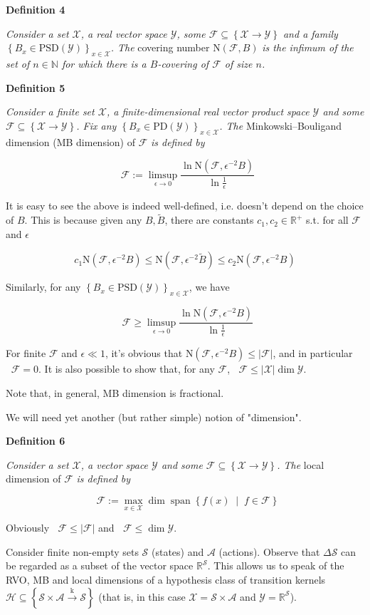 \documentclass[a4paper]{article}
\newcommand{\Co}[1]{}
\DeclareMathOperator{\Sp}{span}
\newcommand{\AP}[1]{\left(#1\right)}
\newcommand{\AC}[1]{\left\{#1\right\}}
\newcommand{\ACM}[2]{\left\{#1\;\middle\vert\;#2\right\}}
\newcommand{\Nats}{\mathbb{N}}
\newcommand{\Reals}{\mathbb{R}}
\newcommand{\PD}{\mathrm{PD}}
\newcommand{\PSD}{\mathrm{PSD}}
\newcommand{\Abs}[1]{\left\vert #1 \right\vert}
\newcommand{\K}{\xrightarrow{\mathrm{k}}}
\newcommand{\B}{B}
\newcommand{\X}{\mathcal{X}}
\newcommand{\Y}{\mathcal{Y}}
\newcommand{\F}{\mathcal{F}}
\newcommand{\St}{\mathcal{S}}
\newcommand{\A}{\mathcal{A}}
\newcommand{\Hy}{\mathcal{H}}
\DeclareMathOperator{\MB}{\dim_{MB}}
\DeclareMathOperator{\LD}{\dim_{loc}}
\newcommand{\N}{\mathrm{N}}
\begin{document}
\textbf{Definition 4}\Co{b}

\textit{Consider a set $\X$, a real vector space $\Y$, some $\F\subseteq\AC{\X\rightarrow\Y}$ and a family $\AC{\B _x\in\PSD(\Y)}_{x\in\X}$. The}\Co{i} covering number $\N(\F,\B )$ \textit{is the infimum of the set of $n\in\Nats$ for which there is a $\B $-covering of $\F$ of size $n$.}\Co{i}

\textbf{Definition 5}\Co{b}

\textit{Consider a finite set $\X$, a finite-dimensional real vector product space $\Y$ and some $\F\subseteq\AC{\X\rightarrow\Y}$. Fix any $\AC{\B_x \in\PD(\Y)}_{x\in\X}$.  The}\Co{i} Minkowski–Bouligand dimension (MB dimension) of $\F$ \textit{is defined by}\Co{i}

$$\MB{\F}:=\limsup_{\epsilon \rightarrow 0}{\frac{\ln{\N\AP{\F,\epsilon^{-2} \B }}}{\ln\frac{1}{\epsilon}}}$$

It is easy to see the above is indeed well-defined, i.e. doesn't depend on the choice of $\B $. This is because given any $\B ,\tilde{\B }$, there are constants $c_1,c_2\in\Reals^+$ s.t. for all $\F$ and $\epsilon$

$$c_1 \N\AP{\F,\epsilon^{-2} \B } \leq \N\AP{\F,\epsilon^{-2} \tilde{\B }} \leq c_2\N\AP{\F,\epsilon^{-2} \B }$$

Similarly, for any $\AC{B_x\in\PSD(\Y)}_{x\in\X}$, we have

$$\MB{\F}\geq\limsup_{\epsilon \rightarrow 0}{\frac{\ln{\N\AP{\F,\epsilon^{-2} \B }}}{\ln\frac{1}{\epsilon}}}$$

For finite $\F$ and $\epsilon\ll1$, it's obvious that $\N\AP{\F,\epsilon^{-2}\B }\leq\Abs{\F}$, and in particular $\MB\F=0$. It is also possible to show that, for any $\F$, $\MB{\F}\leq\Abs{\X}\dim{\Y}$.

Note that, in general, MB dimension is fractional.

We will need yet another (but rather simple) notion of "dimension".

\textbf{Definition 6}\Co{b}

\textit{Consider a set $\X$, a vector space $\Y$ and some $\F\subseteq\AC{\X\rightarrow\Y}$. The}\Co{i} local dimension of $\F$ \textit{is defined by}\Co{i}

$$\LD{\F}:=\max_{x\in\X}{\dim\Sp\ACM{f(x)}{f\in\F}}$$

Obviously $\LD{\F}\leq\Abs{\F}$ and $\LD{\F}\leq\dim{\Y}$.

Consider finite non-empty sets $\St$ (states) and $\A$ (actions). Observe that $\Delta\St$ can be regarded as a subset of the vector space $\Reals^\St$. This allows us to speak of the RVO, MB and local dimensions of a hypothesis class of transition kernels $\Hy\subseteq\AC{\St\times\A\K\St}$ (that is, in this case $\X=\St\times\A$ and $\Y=\Reals^\St$). 
\end{document}
